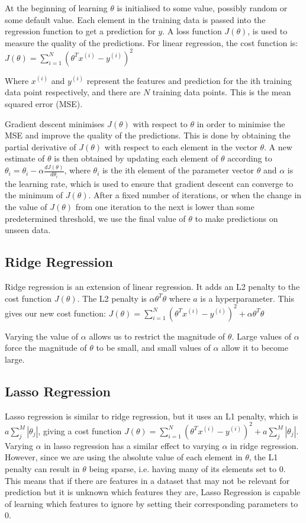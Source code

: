 \documentclass[10pt]{article}
\begin{document}
		At the beginning of learning $\theta$ is initialised to some value, possibly random or some default value. Each element in the training data is passed into the regression function to get a prediction for $y$. A loss function $J(\theta)$, is used to measure the quality of the predictions. For linear regression, the cost function is: $J(\theta) = \sum_{i=1}^{N}(\theta^{T}x^{(i)} - y^{(i)})^2$
		
		Where $x^{(i)}$ and $y^{(i)}$ represent the features and prediction for the ith training data point respectively, and there are $N$ training data points. This is the mean squared error (MSE). 
		
		Gradient descent minimises $J(\theta)$ with respect to $\theta$ in order to minimise the MSE and improve the quality of the predictions. This is done by obtaining the partial derivative of $J(\theta)$ with respect to each element in the vector $\theta$. A new estimate of $\theta$ is then obtained by updating each element of $\theta$ according to $\theta_i = \theta_i - \alpha \frac{dJ(\theta)}{d\theta_i}$, where $\theta_i$ is the ith element of the parameter vector $\theta$ and $\alpha$ is the learning rate, which is used to ensure that gradient descent can converge to the minimum of $J(\theta)$. After a fixed number of iterations, or when the change in the value of $J(\theta)$ from one iteration to the next is lower than some predetermined threshold, we use the final value of $\theta$ to make predictions on unseen data.
		
	\subsection{Ridge Regression}
		Ridge regression is an extension of linear regression. It adds an L2 penalty to the cost function $J(\theta)$. The L2 penalty is $\alpha \theta^T \theta$ where $a$ is a hyperparameter. This gives our new cost function: $J(\theta) = \sum_{i=1}^{N}(\theta^{T}x^{(i)} - y^{(i)})^2 + \alpha \theta^T \theta$
		
		Varying the value of $\alpha$ allows us to restrict the magnitude of $\theta$. Large values of $\alpha$ force the magnitude of $\theta$ to be small, and small values of $\alpha$ allow it to become large.
		
	\subsection{Lasso Regression}
		Lasso regression is similar to ridge regression, but it uses an L1 penalty, which is $a\sum_{j}^{M}|\theta_j|$, giving a cost function $J(\theta) = \sum_{i=1}^{N}(\theta^{T}x^{(i)} - y^{(i)})^2 + a\sum_{j}^{M}|\theta_j|$. Varying $\alpha$ in lasso regression has a similar effect to varying $\alpha$ in ridge regression. However, since we are using the absolute value of each element in $\theta$, the L1 penalty can result in $\theta$ being sparse, i.e. having many of its elements set to 0. This means that if there are features in a dataset that may not be relevant for prediction but it is unknown which features they are, Lasso Regression is capable of learning which features to ignore by setting their corresponding parameters to 0.
	
\end{document}
